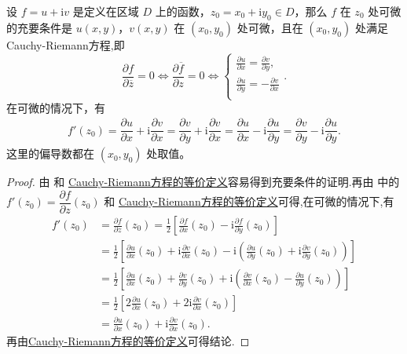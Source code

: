 \documentclass[../../main.tex]{subfiles}%
\begin{document}
\begin{theorem}\label{theorem:复变函数可微的充要条件2}
设 \( f = u + \mathrm{i}v \) 是定义在区域 \( D \) 上的函数，\( z_0 = x_0 + \mathrm{i}y_0 \in D \)，那么 \( f \) 在 \( z_0 \) 处可微的充要条件是 \( u(x, y) \)，\( v(x, y) \) 在 \( (x_0, y_0) \) 处可微，且在 \( (x_0, y_0) \) 处满足Cauchy-Riemann方程,即
\[
\frac{\partial f}{\partial \overline{z}}=0\Longleftrightarrow \frac{\partial \overline{f}}{\partial z}=0\Longleftrightarrow \begin{cases}
\frac{\partial u}{\partial x}=\frac{\partial v}{\partial y},\\
\frac{\partial u}{\partial y}=-\frac{\partial v}{\partial x}\\
\end{cases}.
\]
在可微的情况下，有
\begin{align*}
f'(z_0) = \dfrac{\partial u}{\partial x} + \mathrm{i}\dfrac{\partial v}{\partial x}
= \dfrac{\partial v}{\partial y} + \mathrm{i}\dfrac{\partial v}{\partial x} = \dfrac{\partial u}{\partial x} - \mathrm{i}\dfrac{\partial u}{\partial y} = \dfrac{\partial v}{\partial y} - \mathrm{i}\dfrac{\partial u}{\partial y}.
\end{align*}
这里的偏导数都在 \( (x_0, y_0) \) 处取值。
\end{theorem}
\begin{proof}
由  和 \hyperref[theorem:Cauchy-Riemann方程的等价定义]{Cauchy-Riemann方程的等价定义}容易得到充要条件的证明.再由 中的\( f'(z_0) = \dfrac{\partial f}{\partial z}(z_0) \) 和 \hyperref[theorem:Cauchy-Riemann方程的等价定义]{Cauchy-Riemann方程的等价定义}可得,在可微的情况下,有
\begin{align*}
f' (z_0)&=\frac{\partial f}{\partial z}(z_0)=\frac{1}{2}\left[ \frac{\partial f}{\partial x}(z_0)-\mathrm{i}\frac{\partial f}{\partial y}(z_0) \right] 
\\
&=\frac{1}{2}\left[ \frac{\partial u}{\partial x}(z_0)+\mathrm{i}\frac{\partial v}{\partial x}(z_0)-\mathrm{i}\left( \frac{\partial u}{\partial y}(z_0)+\mathrm{i}\frac{\partial v}{\partial y}(z_0) \right) \right] 
\\
&=\frac{1}{2}\left[ \frac{\partial u}{\partial x}(z_0)+\frac{\partial v}{\partial y}(z_0)+\mathrm{i}\left( \frac{\partial v}{\partial x}(z_0)-\frac{\partial u}{\partial y}(z_0) \right) \right] 
\\
&=\frac{1}{2}\left[ 2\frac{\partial u}{\partial x}(z_0)+2\mathrm{i}\frac{\partial v}{\partial x}(z_0) \right] 
\\
&=\frac{\partial u}{\partial x}(z_0)+\mathrm{i}\frac{\partial v}{\partial x}(z_0).
\end{align*}
再由\hyperref[theorem:Cauchy-Riemann方程的等价定义]{Cauchy-Riemann方程的等价定义}可得结论.
\end{proof}
\end{document}
